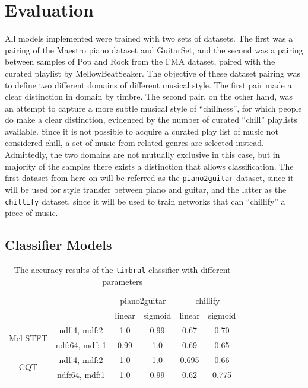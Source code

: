\documentclass[12pt,a4paper,]{report}
\begin{document}
\hypertarget{evaluation}{%
\chapter{Evaluation}\label{evaluation}}

All models implemented were trained with two sets of datasets. The first
was a pairing of the Maestro piano dataset and GuitarSet, and the second
was a pairing between samples of Pop and Rock from the FMA dataset,
paired with the curated playlist by MellowBeatSeaker. The objective of
these dataset pairing was to define two different domains of different
musical style. The first pair made a clear distinction in domain by
timbre. The second pair, on the other hand, was an attempt to capture a
more subtle musical style of ``chillness'', for which people do make a
clear distinction, evidenced by the number of curated ``chill''
playlists available. Since it is not possible to acquire a curated play
list of music not considered chill, a set of music from related genres
are selected instead. Admittedly, the two domains are not mutually
exclusive in this case, but in majority of the samples there exists a
distinction that allows classification. The first dataset from here on
will be referred as the \texttt{piano2guitar} dataset, since it will be
used for style transfer between piano and guitar, and the latter as the
\texttt{chillify} dataset, since it will be used to train networks that
can ``chillify'' a piece of music.

\hypertarget{classifier-models}{%
\section{Classifier Models}\label{classifier-models}}

\begin{table}[h]
\begin{tabular}{cc|c|c|c|c|}
\cline{3-6}
                                                &                & \multicolumn{2}{c|}{piano2guitar} & \multicolumn{2}{c|}{chillify} \\ \cline{3-6} 
                                                &                & linear  & sigmoid & linear & sigmoid \\ \hline
\multicolumn{1}{|c|}{\multirow{2}{*}{Mel-STFT}} & ndf:4, mdf:2   & 1.0     & 0.99    & 0.67   & 0.70    \\ \cline{2-6} 
\multicolumn{1}{|c|}{}                          & ndf:64, mdf: 1 & 0.99    & 1.0     & 0.69   & 0.65    \\ \hline
\multicolumn{1}{|c|}{\multirow{2}{*}{CQT}}      & ndf:4, mdf:2   & 1.0     & 1.0     & 0.695   & 0.66    \\ \cline{2-6} 
\multicolumn{1}{|c|}{}                          & ndf:64, mdf:1  & 1.0     & 0.99    & 0.62   & 0.775    \\ \hline
\end{tabular}
\centering
\caption{The accuracy results of the \texttt{timbral} classifier with different parameters} \label{tab:timbral}
\end{table}
\end{document}
